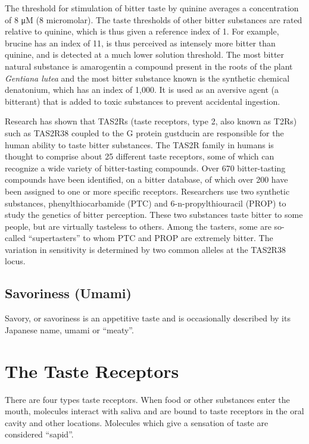 The threshold for stimulation of bitter taste by quinine averages a concentration of 8 μM (8 micromolar). The taste thresholds of other bitter substances are rated relative to quinine, which is thus given a reference index of 1. For example, brucine has an index of 11, is thus perceived as intensely more bitter than quinine, and is detected at a much lower solution threshold. The most bitter natural substance is amarogentin a compound present in the roots of the plant \emph{Gentiana lutea} and the most bitter substance known is the synthetic chemical denatonium, which has an index of 1,000. It is used as an aversive agent (a bitterant) that is added to toxic substances to prevent accidental ingestion.

Research has shown that TAS2Rs (taste receptors, type 2, also known as T2Rs) such as TAS2R38 coupled to the G protein gustducin are responsible for the human ability to taste bitter substances. The TAS2R family in humans is thought to comprise about 25 different taste receptors, some of which can recognize a wide variety of bitter-tasting compounds. Over 670 bitter-tasting compounds have been identified, on a bitter database, of which over 200 have been assigned to one or more specific receptors. Researchers use two synthetic substances, phenylthiocarbamide (PTC) and 6-n-propylthiouracil (PROP) to study the genetics of bitter perception. These two substances taste bitter to some people, but are virtually tasteless to others. Among the tasters, some are so-called ``supertasters'' to whom PTC and PROP are extremely bitter. The variation in sensitivity is determined by two common alleles at the TAS2R38 locus.

\hypertarget{savoriness-umami}{%
\subsection{Savoriness (Umami)}\label{savoriness-umami}}

Savory, or savoriness is an appetitive taste and is occasionally described by its Japanese name, umami or ``meaty''.

\hypertarget{the-taste-receptors}{%
\section{The Taste Receptors}\label{the-taste-receptors}}

There are four types taste receptors. When food or other substances enter the mouth, molecules interact with saliva and are bound to taste receptors in the oral cavity and other locations. Molecules which give a sensation of taste are considered ``sapid''.

